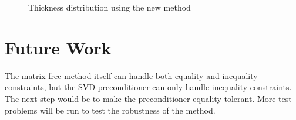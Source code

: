 \documentclass{article}
\theoremstyle{definition}
\begin{document}
\begin{figure}[H]
\centering
{}




\caption{Thickness distribution using the new method}
\label{fig:thick}
\end{figure}

\section{Future Work}
The matrix-free method itself can handle both equality and inequality constraints, but the SVD preconditioner can only handle inequality constraints. The next step would be to make the preconditioner equality tolerant. More test problems will be run to test the robustness of the method. 
\end{document}
